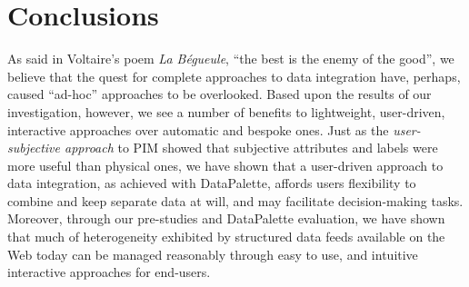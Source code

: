 \documentclass{sigchi}
\begin{document}
%
%
%

\section{Conclusions} %

As said in Voltaire's poem \emph{La B\'{e}gueule}, ``the best is the enemy of the good'', we believe that the quest for complete approaches to data integration have, perhaps, caused ``ad-hoc'' approaches to be overlooked.  Based upon the results of our investigation, however, we see a number of benefits to lightweight, user-driven, interactive approaches over automatic and bespoke ones. Just as the \emph{user-subjective approach} to PIM \cite{user-subjective} showed that subjective attributes and labels were more useful than physical ones, we have shown that a user-driven approach to data integration, as achieved with DataPalette, affords users flexibility to combine and keep separate data at will, and may facilitate decision-making tasks.  Moreover, through our pre-studies and DataPalette evaluation, we have shown that much of heterogeneity exhibited by structured data feeds available on the Web today can be managed reasonably through easy to use, and intuitive interactive approaches for end-users. 


\end{document}
